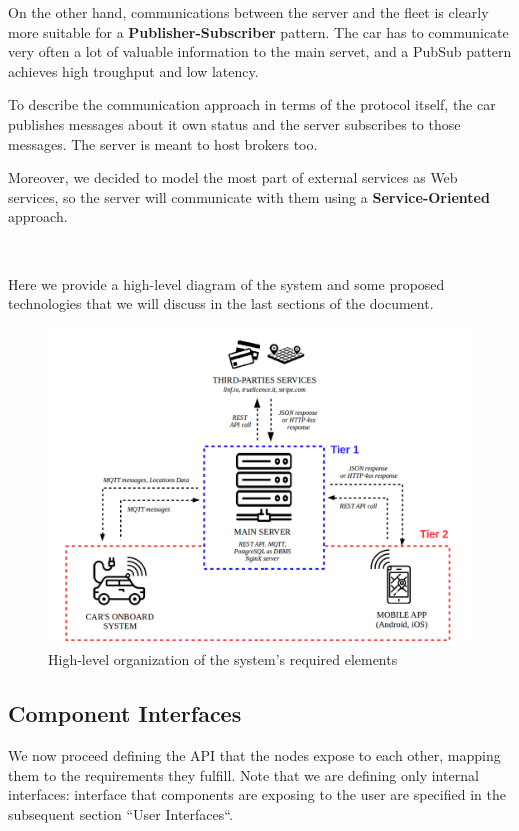 \documentclass[11pt]{article} %
\begin{document}
On the other hand, communications between the server and the fleet is clearly more suitable for a \textbf{Publisher-Subscriber} pattern. The car has to communicate very often a lot of valuable information to the main servet, and a PubSub pattern achieves high troughput and low latency.
 
To describe the communication approach in terms of the protocol itself, the car publishes messages about it own status and the server subscribes to those messages. The server is meant to host brokers too.

Moreover, we decided to model the most part of external services as Web services, so the server will communicate with them using a \textbf{Service-Oriented} approach.

\hfill\

Here we provide a high-level diagram of the system and some proposed technologies that we will discuss in the last sections of  the document.


\begin{figure}[H]
	\centering
	\includegraphics[width=1\textwidth]{proposed_system.png}
	\caption{High-level organization of the system's required elements}
\end{figure}





\subsection{Component Interfaces}

We now proceed defining the API that the nodes expose to each other, mapping them to the requirements they fulfill. Note that we are defining only internal interfaces: interface that components are exposing to the user are specified in the subsequent section ``User Interfaces``.
\end{document}
